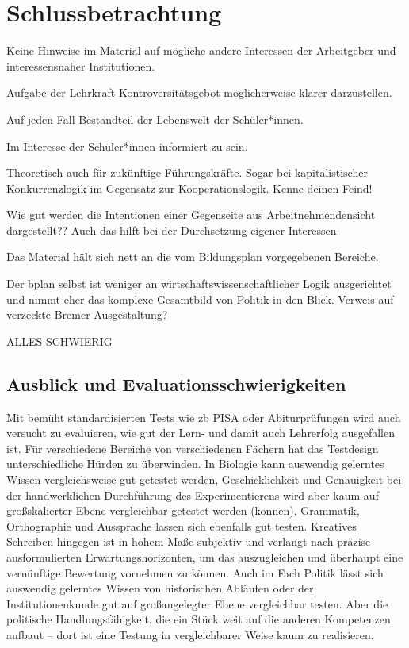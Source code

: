 \autocite[]{Roler2016}

\section{Schlussbetrachtung}
Keine Hinweise im Material auf mögliche andere Interessen der Arbeitgeber und interessensnaher Institutionen.

Aufgabe der Lehrkraft Kontroversitätsgebot möglicherweise klarer darzustellen.

Auf jeden Fall Bestandteil der Lebenswelt der Schüler*innen.

Im Interesse der Schüler*innen informiert zu sein.

Theoretisch auch für zukünftige Führungskräfte. Sogar bei kapitalistischer Konkurrenzlogik im Gegensatz zur Kooperationslogik. Kenne deinen Feind!

Wie gut werden die Intentionen einer Gegenseite aus Arbeitnehmendensicht dargestellt??
Auch das hilft bei der Durchsetzung eigener Interessen.

Das Material hält sich nett an die vom Bildungsplan vorgegebenen Bereiche. 

Der bplan selbst ist weniger an wirtschaftswissenschaftlicher Logik ausgerichtet und nimmt eher das komplexe Gesamtbild von Politik in den Blick.
Verweis auf verzeckte Bremer Ausgestaltung?

ALLES SCHWIERIG

\subsection{Ausblick und Evaluationsschwierigkeiten}
Mit bemüht standardisierten Tests wie \gls{zb} PISA oder Abiturprüfungen wird auch versucht zu evaluieren, wie gut der Lern- und damit auch Lehrerfolg ausgefallen ist. Für verschiedene Bereiche von verschiedenen Fächern hat das Testdesign unterschiedliche Hürden zu überwinden. 
In Biologie kann auswendig gelerntes Wissen vergleichsweise gut getestet werden, Geschicklichkeit und Genauigkeit bei der handwerklichen Durchführung des Experimentierens wird aber kaum auf großskalierter Ebene vergleichbar getestet werden (können).
Grammatik, Orthographie und Aussprache lassen sich ebenfalls gut testen. Kreatives Schreiben hingegen ist in hohem Maße subjektiv und verlangt nach präzise ausformulierten Erwartungshorizonten, um das auszugleichen und überhaupt eine vernünftige Bewertung vornehmen zu können. 
Auch im Fach Politik lässt sich auswendig gelerntes Wissen von historischen Abläufen oder der Institutionenkunde gut auf großangelegter Ebene vergleichbar testen. Aber die politische Handlungsfähigkeit, die ein Stück weit auf die anderen Kompetenzen aufbaut -- dort ist eine Testung in vergleichbarer Weise kaum zu realisieren. 

